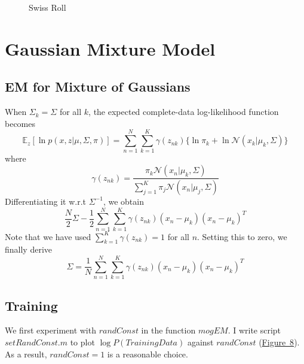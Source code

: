 \documentclass{article}
\begin{document}
\begin{figure}
	\centering

	\caption{Swiss Roll}
	\label{fig-7}
\end{figure}


\section{Gaussian Mixture Model}
\subsection{EM for Mixture of Gaussians}
When $\Sigma_k = \Sigma$ for all $k$, the expected complete-data log-likelihood function becomes
\[
\mathbb{E}_z[\ln p(x,z|\mu,\Sigma,\pi)] = \sum_{n=1}^N\sum_{k=1}^K\gamma(z_{nk})\{\ln \pi_k + \ln \mathcal{N}(x_k|\mu_k, \Sigma)\}
\]
where
\[
\gamma(z_{nk}) = \frac{\pi_k\mathcal{N}(x_n|\mu_k, \Sigma)}{\sum_{j=1}^K \pi_j\mathcal{N}(x_n|\mu_j,\Sigma)}
\]
Differentiating it w.r.t $\Sigma^{-1}$, we obtain
\[
\frac{N}{2} \Sigma - \frac{1}{2} \sum_{n=1}^N\sum_{k=1}^K\gamma(z_{nk})(x_n-\mu_k)(x_n-\mu_k)^T
\]
Note that we have used $\sum_{k=1}^K\gamma(z_{nk})=1$ for all $n$. Setting this to zero, we finally derive
\[
\Sigma = \frac{1}{N} \sum_{n=1}^N\sum_{k=1}^K\gamma(z_{nk})(x_n-\mu_k)(x_n-\mu_k)^T
\]
\subsection{Training}
We first experiment with $randConst$ in the function $mogEM$. I write script $setRandConst.m$ to plot $\log P(TrainingData)$ against $randConst$ (\hyperref[fig-8]{Figure~8}). As a result, $randConst = 1$ is a reasonable choice.
\end{document}
